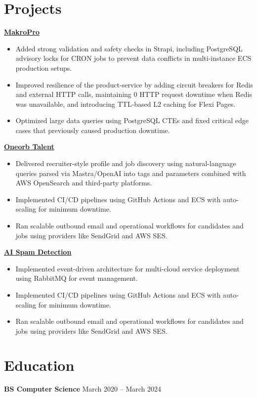 \documentclass[a4paper,10pt]{article}
\begin{document}
\section*{Projects}
\vspace{0.2cm}

\href{https://makro.pro}{\textbf{MakroPro}}

\vspace{0.2cm}

\begin{itemize}
    \item Added strong validation and safety checks in Strapi, including PostgreSQL advisory locks for CRON jobs to prevent data conflicts in multi-instance ECS production setups.
    \item Improved resilience of the product-service by adding circuit breakers for Redis and external HTTP calls, maintaining 0 HTTP request downtime when Redis was unavailable, and introducing TTL-based L2 caching for Flexi Pages.
    \item Optimized large data queries using PostgreSQL CTEs and fixed critical edge cases that previously caused production downtime.
\end{itemize}

\vspace{0.2cm}

\href{https://oneorb.io}{\textbf{Oneorb Talent}}

\vspace{0.2cm}

\begin{itemize}
    \item Delivered recruiter-style profile and job discovery using natural-language queries parsed via Mastra/OpenAI into tags and parameters combined with AWS OpenSearch and third-party platforms.
    \item Implemented CI/CD pipelines using GitHub Actions and ECS with auto-scaling for minimum downtime.
    \item Ran scalable outbound email and operational workflows for candidates and jobs using providers like SendGrid and AWS SES.
\end{itemize}

\vspace{0.2cm}

\href{https://spamchecker.oneorb.io}{\textbf{AI Spam Detection}}

\vspace{0.2cm}

\begin{itemize}
    \item Implemented event-driven architecture for multi-cloud service deployment using RabbitMQ for event management.
    \item Implemented CI/CD pipelines using GitHub Actions and ECS with auto-scaling for minimum downtime.
    \item Ran scalable outbound email and operational workflows for candidates and jobs using providers like SendGrid and AWS SES.
\end{itemize}

\section*{Education}
\vspace{0.1cm}

\textbf{BS Computer Science} \hfill March 2020 -- March 2024
\end{document}
